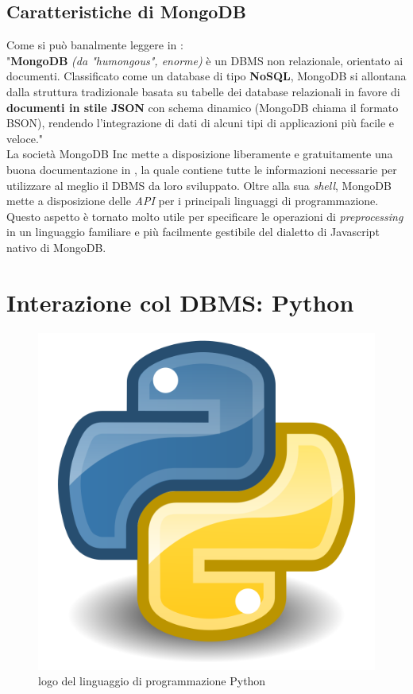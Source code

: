     \subsection{Caratteristiche di MongoDB}

        Come si può banalmente leggere in \cite{mongowiki}: \\

        "\textbf{MongoDB} \textit{(da "humongous", enorme)} è un DBMS non relazionale, orientato ai documenti. Classificato come un database di tipo \textbf{NoSQL}, MongoDB si allontana dalla struttura tradizionale basata su tabelle dei database relazionali in favore di \textbf{documenti in stile JSON} con schema dinamico (MongoDB chiama il formato BSON), rendendo l'integrazione di dati di alcuni tipi di applicazioni più facile e veloce." \\

        La società MongoDB Inc mette a disposizione liberamente e gratuitamente una buona documentazione in \cite{mongodb}, la quale contiene tutte le informazioni necessarie per utilizzare al meglio il DBMS da loro sviluppato. Oltre alla sua \textit{shell}, MongoDB mette a disposizione delle \textit{API} per i principali linguaggi di programmazione. Questo aspetto è tornato molto utile per specificare le operazioni di \textit{preprocessing} in un linguaggio familiare e più facilmente gestibile del dialetto di Javascript nativo di MongoDB.

\section{Interazione col DBMS: Python}

    \begin{figure}
        \centering
        \caption{logo del linguaggio di programmazione Python}
        \label{python_logo}
    	\includegraphics[scale=0.12]{img/python.png}
    \end{figure}

